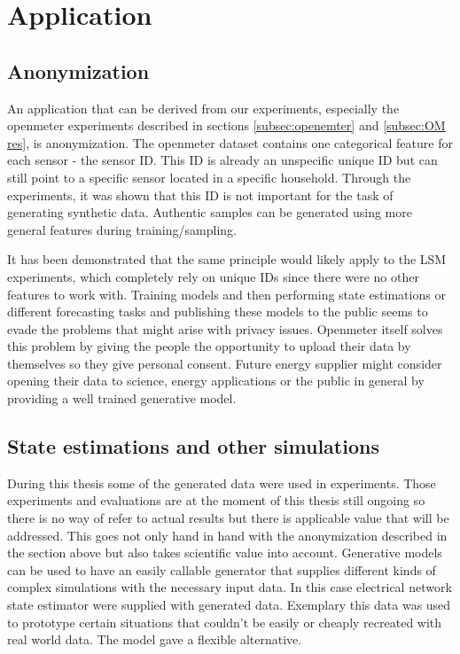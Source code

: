 \chapter{Application}
\label{sec:application}
\section{Anonymization}
\label{sec:anonym}
An application that can be derived from our experiments, especially the openmeter experiments described in sections \ref{subsec:openemter} and \ref{subsec:OM res}, is anonymization. The openmeter dataset contains one categorical feature for each sensor - the sensor ID. This ID is already an unspecific unique ID but can still point to a specific sensor located in a specific household. Through the experiments, it was shown that this ID is not important for the task of generating synthetic data. Authentic samples can be generated using more general features during training/sampling.

It has been demonstrated that the same principle would likely apply to the LSM experiments, which completely rely on unique IDs since there were no other features to work with.
Training models and then performing state 
estimations or different forecasting tasks and publishing these models to the public seems to evade the problems that might arise with privacy issues. Openmeter itself solves this problem by giving the people the opportunity to upload their data by themselves so they give personal consent. 
Future energy supplier might consider opening their data to science, energy applications or the public in general by providing a well trained generative model.

\section{State estimations and other simulations}
\label{sec:state estem}
During this thesis some of the generated data were used in experiments. Those experiments and evaluations are at the moment of this thesis still ongoing so there is no way of refer to actual results but there is applicable value that will be addressed. This goes not only hand in hand with the anonymization described in the section above but also takes scientific value into account. Generative models can be used to have an easily callable generator that supplies different kinds of complex simulations with the necessary input data. In this case electrical network state estimator were supplied with generated data. Exemplary this data was used to prototype certain situations that couldn't be easily or cheaply recreated with real world data. The model gave a flexible alternative.

